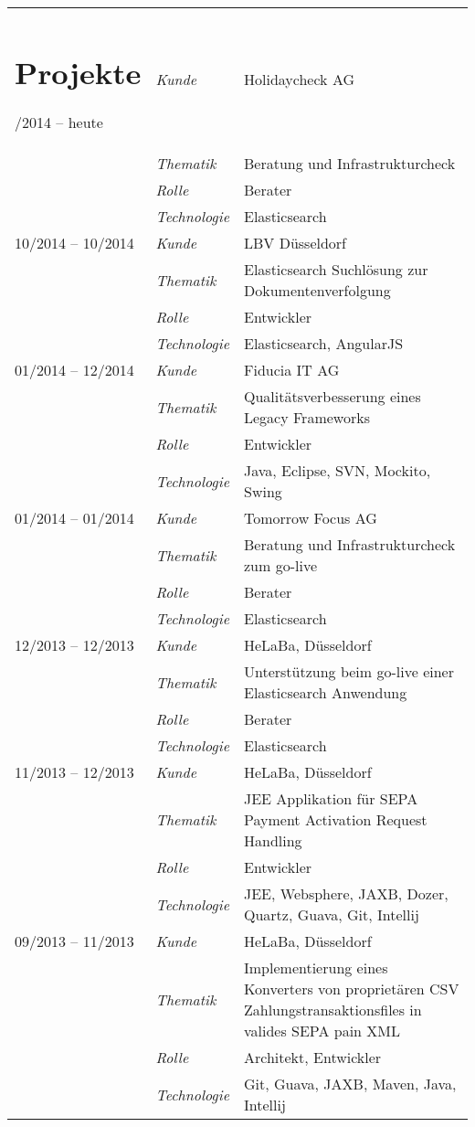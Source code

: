 
\begin{longtable}{@{}>{}p{4cm}>{\itshape}p{3cm}>{}p{9cm}}
\section*{Projekte}
\endhead
11/2014 -- heute &	Kunde	& Holidaycheck AG \\
	&	Thematik	& Beratung und Infrastrukturcheck \\
	& Rolle	& Berater \\
	& Technologie	& Elasticsearch \\

10/2014 -- 10/2014 & Kunde & LBV Düsseldorf \\
& Thematik & Elasticsearch Suchlösung zur Dokumentenverfolgung\\
	& Rolle	& Entwickler\\
	& Technologie & Elasticsearch, AngularJS\\

01/2014 -- 12/2014 & 	Kunde	& Fiducia IT AG \\
& Thematik & Qualitätsverbesserung eines Legacy Frameworks \\
& Rolle & Entwickler\\
&Technologie & Java, Eclipse, SVN, Mockito, Swing\\

01/2014 -- 01/2014 &	Kunde	& Tomorrow Focus AG\\
& Thematik & Beratung und Infrastrukturcheck zum go-live\\
& Rolle& Berater \\
& Technologie & Elasticsearch\\

12/2013	-- 12/2013 & Kunde & HeLaBa, Düsseldorf\\
& Thematik & Unterstützung beim go-live einer Elasticsearch Anwendung\\
& Rolle & Berater\\
& Technologie & Elasticsearch\\

11/2013 -- 12/2013 & Kunde & HeLaBa, Düsseldorf\\
& Thematik	& JEE Applikation für SEPA Payment Activation Request Handling\\
& Rolle& Entwickler\\
& Technologie &	JEE, Websphere, JAXB, Dozer, Quartz, Guava, Git, Intellij\\

09/2013 -- 11/2013	& Kunde	 & HeLaBa, Düsseldorf\\
& Thematik & Implementierung eines Konverters von proprietären CSV
Zahlungstransaktionsfiles in valides SEPA pain XML\\
& Rolle & Architekt, Entwickler\\
&Technologie& Git, Guava, JAXB, Maven, Java, Intellij\\


\end{longtable}
